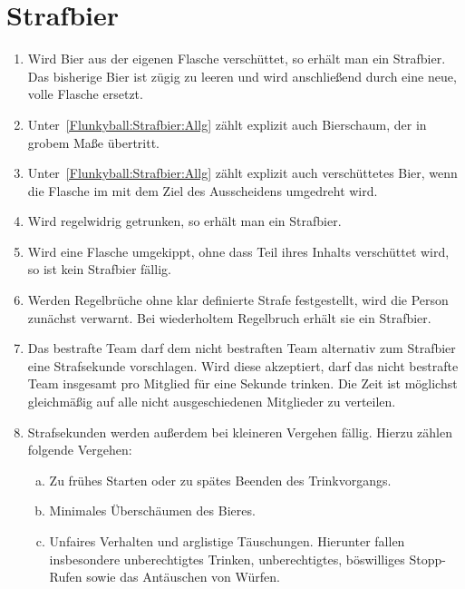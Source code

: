\section{Strafbier}
\begin{enumerate}[label={(\arabic*)}]
    \item\label{Flunkyball:Strafbier:Allg}
    Wird Bier aus der eigenen Flasche verschüttet, so erhält man ein Strafbier.
    Das bisherige Bier ist zügig zu leeren und wird anschließend durch eine neue, volle Flasche ersetzt.

    \item
    Unter~\ref{Flunkyball:Strafbier:Allg} zählt explizit auch Bierschaum, der in grobem Maße übertritt.

    \item
    Unter~\ref{Flunkyball:Strafbier:Allg} zählt explizit auch verschüttetes Bier, wenn die Flasche im mit dem Ziel des Ausscheidens umgedreht wird.

    \item
    Wird regelwidrig getrunken, so erhält man ein Strafbier.

    \item
    Wird eine Flasche umgekippt, ohne dass Teil ihres Inhalts verschüttet wird, so ist kein Strafbier fällig.

    \item
    Werden Regelbrüche ohne klar definierte Strafe festgestellt, wird die Person zunächst verwarnt.
    Bei wiederholtem Regelbruch erhält sie ein Strafbier.

    \item
    Das bestrafte Team darf dem nicht bestraften Team alternativ zum Strafbier eine Strafsekunde vorschlagen.
    Wird diese akzeptiert, darf das nicht bestrafte Team insgesamt pro Mitglied für eine Sekunde trinken.
    Die Zeit ist möglichst gleichmäßig auf alle nicht ausgeschiedenen Mitglieder zu verteilen.

    \item
    Strafsekunden werden außerdem bei kleineren Vergehen fällig.
    Hierzu zählen folgende Vergehen:
    \begin{enumerate}[a.]
        \item
        Zu frühes Starten oder zu spätes Beenden des Trinkvorgangs.
        \item
        Minimales Überschäumen des Bieres.
        \item
        Unfaires Verhalten und arglistige Täuschungen.
        Hierunter fallen insbesondere unberechtigtes Trinken, unberechtigtes, böswilliges \glqq{}Stopp\grqq{}-Rufen sowie das Antäuschen von Würfen.
    \end{enumerate}
\end{enumerate}
